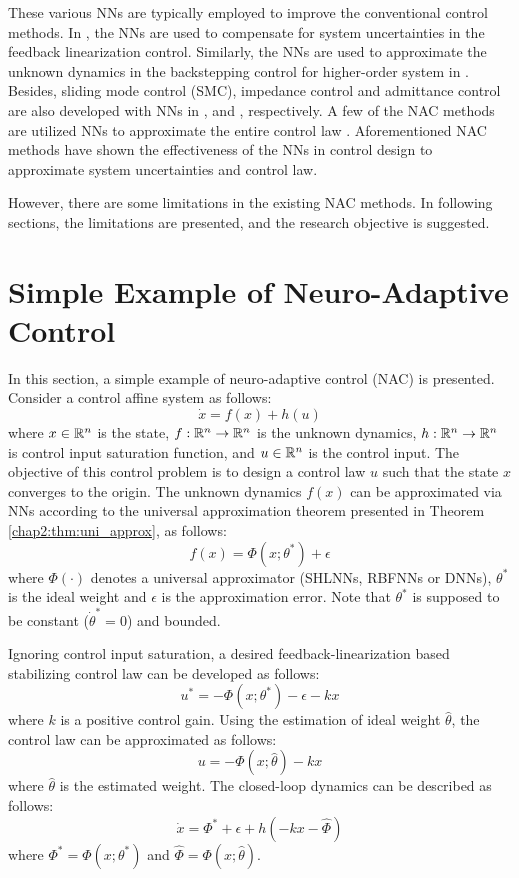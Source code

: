 These various NNs are typically employed to improve the conventional control methods.
In \cite{RN69, RN95}, the NNs are used to compensate for system uncertainties in the feedback linearization control.
Similarly, the NNs are used to approximate the unknown dynamics in the backstepping control for higher-order system in \cite{RN85, RN19, RN71, RN80}.
Besides, sliding mode control (SMC), impedance control and admittance control are also developed with NNs in \cite{RN64}, \cite{RN89} and \cite{RN82}, respectively.
A few of the NAC methods are utilized NNs to approximate the entire control law \cite{RN46}.
Aforementioned NAC methods have shown the effectiveness of the NNs in control design to approximate system uncertainties and control law.

However, there are some limitations in the existing NAC methods.
In following sections, the limitations are presented, and the research objective is suggested.

\section{Simple Example of Neuro-Adaptive Control} \label{chap1:sec:example}

In this section, a simple example of neuro-adaptive control (NAC) is presented.
Consider a control affine system as follows:
\begin{equation}
    \dot x = f(x) + h(u)
\end{equation}
where $x \in \mathbb{R}^n$ is the state, $f:\mathbb{R}^n\to\mathbb{R}^n$ is the unknown dynamics, $h:\mathbb{R}^n\to\mathbb{R}^n$ is control input saturation function, and $u \in \mathbb{R}^n$ is the control input.
The objective of this control problem is to design a control law $u$ such that the state $x$ converges to the origin.
The unknown dynamics $f(x)$ can be approximated via NNs according to the universal approximation theorem presented in Theorem \ref{chap2:thm:uni_approx}, as follows:
\begin{equation}
    f(x) = \Phi(x;\theta^*) + \epsilon
\end{equation}
where $\Phi(\cdot)$ denotes a universal approximator (\eg SHLNNs, RBFNNs or DNNs), $\theta^*$ is the ideal weight and $\epsilon$ is the approximation error.
Note that $\theta^*$ is supposed to be constant ($\dot\theta^*=0$) and bounded.

Ignoring control input saturation, a desired feedback-linearization based stabilizing control law can be developed as follows:
\begin{equation}
    u^* = -\Phi(x;\theta^*) - \epsilon - k x
\end{equation}
where $k$ is a positive control gain. 
Using the estimation of ideal weight $\hat\theta$, the control law can be approximated as follows:
\begin{equation}
    u = -\Phi(x;\hat\theta) - k x
\end{equation}
where $\hat\theta$ is the estimated weight.
The closed-loop dynamics can be described as follows:
\begin{equation}
    \dot x = \Phi^*+\epsilon + h(-kx-\hat\Phi )
\end{equation}
where $\Phi^* = \Phi(x;\theta^*)$ and $\hat\Phi = \Phi(x;\hat\theta)$.

